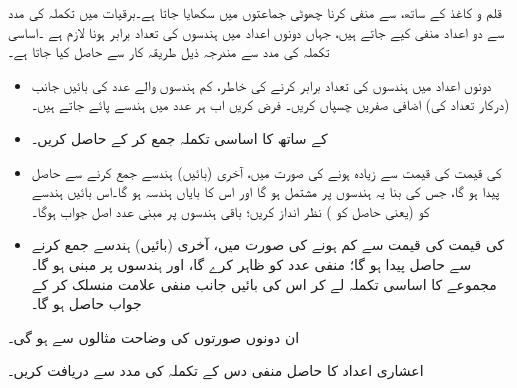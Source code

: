 قلم و کاغذ  کے ساتھ،   سے   منفی کرنا چھوٹی جماعتوں میں سکھایا جاتا ہے۔برقیات  میں تکملہ کی مدد سے دو اعداد منفی کیے جاتے ہیں، جہاں دونوں اعداد میں ہندسوں کی تعداد برابر ہونا لازم ہے ۔اساسی تکملہ  کی مدد سے     مندرجہ ذیل طریقہ کار سے حاصل کیا جاتا ہے۔
\begin{itemize}
    \item
     دونوں  اعداد میں ہندسوں کی تعداد   برابر  کرنے کی خاطر،  کم ہندسوں  والے   عدد کی بائیں جانب  (درکار تعداد کی) اضافی صفریں  چسپاں کریں۔ فرض کریں اب ہر عدد میں     ہندسے پائے جاتے ہیں۔ 
    \item
     کے ساتھ    کا اساسی تکملہ جمع کر کے       حاصل کریں۔
   \item
        کی قیمت    کی قیمت سے زیادہ ہونے کی صورت میں، آخری  (بائیں)  ہندسے جمع کرنے سے  حاصل   پیدا ہو  گا،  جس کی بنا  یہ    ہندسوں پر مشتمل  ہو گا اور اس کا  بایاں ہندسہ         ہو گا۔اس  بائیں ہندسے    کو (یعنی حاصل  کو )  نظر انداز کریں؛ باقی    ہندسوں پر مبنی عدد اصل جواب ہوگا۔
    \item
{}کی قیمت   کی قیمت سے کم  ہونے کی صورت میں،  آخری  (بائیں)  ہندسے جمع کرنے سے  حاصل   پیدا    ہو  گا؛        منفی عدد کو ظاہر کرے گا، اور  ہندسوں  پر مبنی ہو گا۔مجموعے کا اساسی تکملہ لے کر اس کی بائیں جانب  منفی علامت  منسلک  کر کے  جواب  حاصل ہو گا۔
\end{itemize}
ان  دونوں صورتوں کی وضاحت مثالوں  سے ہو  گی۔ 

 اعشاری اعداد  کا حاصل منفی   دس کے    تکملہ    کی مدد سے   دریافت  کریں۔ 
 
